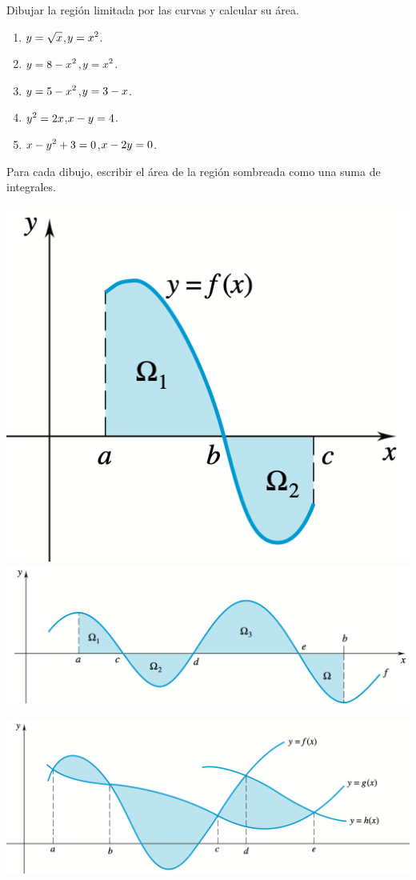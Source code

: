 \item Dibujar la región limitada por las curvas y calcular su área.
\begin{multicols}{2}
  \begin{enumerate}
    \item $\displaystyle y= \sqrt x$,\quad $\displaystyle y= x^2$.
    \item $\displaystyle y= 8-x^2$,\quad $\displaystyle y= x^2 $.
    \item $\displaystyle y= 5-x^2$,\quad $\displaystyle y= 3-x $.
    \item $\displaystyle y^2=2x$,\quad $\displaystyle x-y=4  $.
    \item $\displaystyle x-y^2+3=0 $,\quad $\displaystyle x-2y=0  $.
  \end{enumerate}
  
\end{multicols}

\item Para cada dibujo, escribir el área de la región sombreada como una suma de integrales.

\begin{center}
  \includegraphics[height=.22\textwidth]{pics/areas-7a.png}
  \hfil
  \includegraphics[height=.22\textwidth]{pics/areas-7b.png}

  \includegraphics[height=.28\textwidth]{pics/areas-7c.png}
\end{center}
